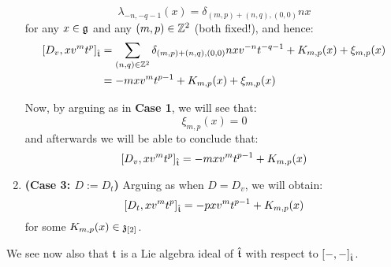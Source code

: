 \begin{remark}
\begin{enumerate}
                    $$\lambda_{-n, -q - 1}(x) = \delta_{(m, p) + (n, q), (0, 0)} n x$$
                for any $x \in \mathfrak{g}$ and any $(m, p) \in \mathbb{Z}^2$ (both fixed!), and hence:
                    $$
                        \begin{aligned}
                            [D_v, x v^m t^p]_{\extendedtoroidal} & = \sum_{(n, q) \in \Z^2} \delta_{(m, p) + (n, q), (0, 0)} n x v^{-n} t^{-q - 1} + K_{m, p}(x) + \xi_{m, p}(x)
                            \\
                            & = -m x v^m t^{p - 1} + K_{m, p}(x) + \xi_{m, p}(x)
                        \end{aligned}
                    $$

                Now, by arguing as in \textbf{Case 1}, we will see that:
                    $$\xi_{m, p}(x) = 0$$
                and afterwards we will be able to conclude that:
                    $$[D_v, x v^m t^p]_{\hat{\mathfrak{t}}} = -m x v^m t^{p - 1} + K_{m, p}(x)$$
                \item \textbf{(Case 3: $D := D_t$)} Arguing as when $D = D_v$, we will obtain:
                    $$[D_t, x v^m t^p]_{\hat{\mathfrak{t}}} = -p x v^m t^{p - 1} + K_{m, p}(x)$$
                for some $K_{m, p}(x) \in \mathfrak{z}_{[2]}$.
            \end{enumerate}
        \end{remark}
        \begin{remark}
            We see now also that $\mathfrak{t}$ is a Lie algebra ideal of $\hat{\mathfrak{t}}$ with respect to $[-, -]_{\hat{\mathfrak{t}}}$.
        \end{remark}

